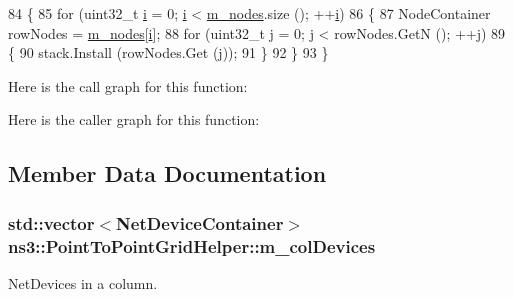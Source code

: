 \begin{DoxyCode}
84 \{
85   \textcolor{keywordflow}{for} (uint32\_t \hyperlink{bernuolliDistribution_8m_a6f6ccfcf58b31cb6412107d9d5281426}{i} = 0; \hyperlink{bernuolliDistribution_8m_a6f6ccfcf58b31cb6412107d9d5281426}{i} < \hyperlink{classns3_1_1PointToPointGridHelper_a6b36a3c5b58497f3899b089807b25266}{m\_nodes}.size (); ++\hyperlink{bernuolliDistribution_8m_a6f6ccfcf58b31cb6412107d9d5281426}{i})
86     \{
87       NodeContainer rowNodes = \hyperlink{classns3_1_1PointToPointGridHelper_a6b36a3c5b58497f3899b089807b25266}{m\_nodes}[\hyperlink{bernuolliDistribution_8m_a6f6ccfcf58b31cb6412107d9d5281426}{i}];
88       \textcolor{keywordflow}{for} (uint32\_t j = 0; j < rowNodes.GetN (); ++j)
89         \{
90           stack.Install (rowNodes.Get (j));
91         \}
92     \}
93 \}
\end{DoxyCode}


Here is the call graph for this function\+:




Here is the caller graph for this function\+:




\subsection{Member Data Documentation}
\subsubsection[{\texorpdfstring{m\+\_\+col\+Devices}{m_colDevices}}]{\setlength{\rightskip}{0pt plus 5cm}std\+::vector$<${\bf Net\+Device\+Container}$>$ ns3\+::\+Point\+To\+Point\+Grid\+Helper\+::m\+\_\+col\+Devices\hspace{0.3cm}{\ttfamily [private]}}\hypertarget{classns3_1_1PointToPointGridHelper_a7466f6cdc7e0c8b2461471a6f8921192}{}\label{classns3_1_1PointToPointGridHelper_a7466f6cdc7e0c8b2461471a6f8921192}


Net\+Devices in a column. 

